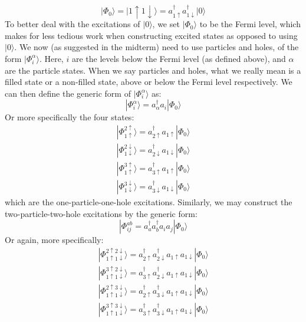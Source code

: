 \documentclass{article}
\begin{document}
\begin{equation}
    | \Phi_0 \rangle = | 1\uparrow 1 \downarrow \rangle = a^\dagger_{1 \uparrow} a^\dagger_{1 \downarrow} | 0 \rangle 
\end{equation}
To better deal with the excitations of $| 0 \rangle$, we set $|\Phi_0 \rangle$ to be the Fermi level, which makes for less tedious work when constructing excited states as opposed to using $|0 \rangle$. We now (as suggested in the midterm) need to use particles and holes, of the form $| \Phi_i^\alpha \rangle$. Here, $i$ are the levels below the Fermi level (as defined above), and $\alpha$ are the particle states. When we say particles and holes, what we really mean is a filled state or a non-filled state, above or below the Fermi level respectively.
\newline
We can then define the generic form of $| \Phi_i^\alpha \rangle$ as:
\begin{equation} \label{gen}
    | \Phi_i^\alpha \rangle = a_\alpha^\dagger a_i | \Phi_0 \rangle
\end{equation}
Or more specifically the four states:
\begin{gather*}
    | \Phi_{1 \uparrow}^{2\uparrow} \rangle = a_{2 \uparrow}^\dagger a_{1\uparrow} | \Phi_0 \rangle \\
    | \Phi_{1 \downarrow}^{2\downarrow} \rangle = a_{2 \downarrow}^\dagger a_{1\downarrow} | \Phi_0 \rangle \\
    | \Phi_{1 \uparrow}^{3\uparrow} \rangle = a_{3 \uparrow}^\dagger a_{1\uparrow} | \Phi_0 \rangle \\
    | \Phi_{1 \downarrow}^{3\downarrow} \rangle = a_{3 \downarrow}^\dagger a_{1\downarrow} | \Phi_0 \rangle
\end{gather*}
which are the one-particle-one-hole excitations. Similarly, we may construct the two-particle-two-hole excitations by the generic form:
\begin{equation}
    | \Phi _{ij}^{a b} = a_a^\dagger a_b^\dagger a_i a_j |\Phi_0 \rangle
\end{equation}
Or again, more specifically:
\begin{gather*}
    | \Phi_{1\uparrow 1 \downarrow}^{2 \uparrow 2 \downarrow} \rangle = a_{2 \uparrow}^\dagger a_{2\downarrow}^\dagger a_{1 \uparrow} a_{1\downarrow} | \Phi_0 \rangle \\
    | \Phi_{1\uparrow 1 \downarrow}^{3 \uparrow 2 \downarrow} \rangle = a_{3 \uparrow}^\dagger a_{2\downarrow}^\dagger a_{1 \uparrow} a_{1\downarrow} | \Phi_0 \rangle \\
    | \Phi_{1\uparrow 1 \downarrow}^{2 \uparrow 3 \downarrow} \rangle = a_{2 \uparrow}^\dagger a_{3\downarrow}^\dagger a_{1 \uparrow} a_{1\downarrow} | \Phi_0 \rangle \\
    | \Phi_{1\uparrow 1 \downarrow}^{3 \uparrow 3 \downarrow} \rangle = a_{3 \uparrow}^\dagger a_{3\downarrow}^\dagger a_{1 \uparrow} a_{1\downarrow} | \Phi_0 \rangle
\end{gather*}
\end{document}
